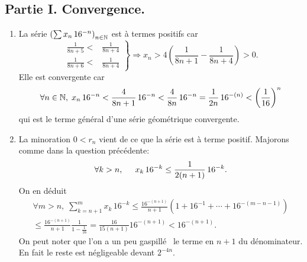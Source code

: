 \subsection*{Partie I. Convergence.}
\begin{enumerate}
 \item La série $\left( \sum x_n \, 16^{-n}\right)_{n \in \mathbb{N}}$ est à termes positifs car 
\begin{displaymath}
\left. 
\begin{aligned}
\frac{1}{8n+5} < & \frac{1}{8n+4} \\ \frac{1}{8n+6} < & \frac{1}{8n+4}
\end{aligned}
\right\rbrace 
\Rightarrow
x_n > 4\left( \frac{1}{8n+1} - \frac{1}{8n+4}\right) > 0. 
\end{displaymath}
Elle est convergente car 
\begin{displaymath}
\forall n \in \mathbb{N}, \; x_n\,16^{-n} <  \frac{4}{8n+1}\,16^{-n} < \frac{4}{8n}\,16^{-n} = \frac{1}{2n}\,16^{-(n)}<\left( \frac{1}{16}\right)^{n} 
\end{displaymath}
qui est le terme général d'une série géométrique convergente.

 \item La minoration $0<r_n$ vient de ce que la série est à terme positif. Majorons comme dans la question précédente:
\begin{displaymath}
\forall k >n, \hspace{0.5cm} x_k\,16^{-k}\leq \frac{1}{2(n+1)}\,16^{-k}.
\end{displaymath}
On en déduit
\begin{multline*}
\forall m > n, \;
\sum_{k=n+1}^{m}x_k\,16^{-k} \leq \frac{16^{-(n+1)}}{n+1}\left(1 + 16^{-1} + \cdots + 16^{-(m-n-1)} \right) \\
\leq \frac{16^{-(n+1)}}{n+1} \frac{1}{1-\frac{1}{16}}
= \frac{16}{15(n+1)} 16^{-(n+1)} < 16^{-(n+1)}. 
\end{multline*}
On peut noter que l'on a un peu \og gaspillé\fg~ le terme en $n+1$ du dénominateur. En fait le reste est négligeable devant $2^{-4n}$.
\end{enumerate}

